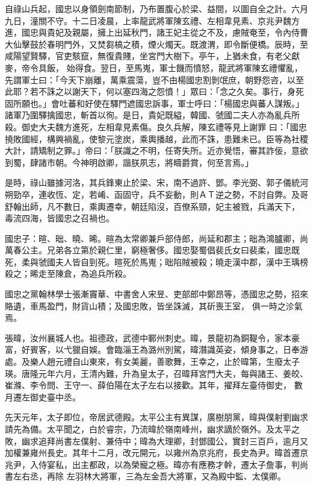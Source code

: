 \begin{pinyinscope}
 自祿山兵起，國忠以身領劍南節制，乃布置腹心於梁、益間，以圖自全之計。六月九日，潼關不守。十二日凌晨，上率龍武將軍陳玄禮、左相韋見素、京兆尹魏方進，國忠與貴妃及親屬，擁上出延秋門，諸王妃主從之不及，慮賊奄至，令內侍曹大仙擊鼓於春明門外，又焚芻槁之積，煙火燭天。既渡渭，即令斷便橋。辰時，至咸陽望賢驛，官吏駭竄，無復貴賤，坐宮門大樹下。亭午，上猶未食，有老父獻麥，帝令具飯，
 始得食。翌日，至馬嵬，軍士饑而憤怒，龍武將軍陳玄禮懼亂，先謂軍士曰：「今天下崩離，萬乘震蕩，豈不由楊國忠割剝氓庶，朝野怨咨，以至此耶？若不誅之以謝天下，何以塞四海之怨憤！」眾曰：「念之久矣。事行，身死固所願也。」會吐蕃和好使在驛門遮國忠訴事，軍士呼曰：「楊國忠與蕃人謀叛。」諸軍乃圍驛擒國忠，斬首以徇。是日，貴妃既縊，韓國、虢國二夫人亦為亂兵所殺。御史大夫魏方進死，左相韋見素傷。良久兵解，陳玄禮等見上謝罪
 曰：「國忠撓敗國經，構興禍亂，使黎元塗炭，乘輿播越，此而不誅，患難未已。臣等為社稷大計，請矯制之罪。」帝曰：「朕識之不明，任寄失所。近亦覺悟，審其詐佞，意欲到蜀，肆諸市朝。今神明啟卿，諧朕夙志，將疇爵賞，何至言焉。」



 是時，祿山雖據河洛，其兵鋒東止於梁、宋，南不過許、鄧。李光弼、郭子儀統河朔勁卒，連收恆、定，若崤、函固守，兵不妄動，則ＡＴ逆之勢，不討自弊。及哥舒翰出師，凡不數日，乘輿遷幸，朝廷陷沒，百僚系頸，妃主被戮，兵滿天下，
 毒流四海，皆國忠之召禍也。



 國忠子：暄、昢、曉、晞。暄為太常卿兼戶部侍郎，尚延和郡主；昢為鴻臚卿，尚萬春公主。兄弟各立第於親仁里，窮極奢侈。國忠娶蜀倡裴氏女曰裴柔，國忠既死，柔與虢國夫人皆自剄死。暄死於馬嵬；昢陷賊被殺；曉走漢中郡，漢中王瑀榜殺之；晞走至陳倉，為追兵所殺。



 國忠之黨翰林學士張漸竇華、中書舍人宋昱、吏部郎中鄭昂等，憑國忠之勢，招來賂遺，車馬盈門，財貨山積；及國忠敗，皆坐誅滅，其斫喪王室，
 俱一時之沴氣焉。



 張暐，汝州襄城人也。祖德政，武德中鄆州刺史。暐，景龍初為銅鞮令，家本豪富，好賓客，以弋獵自娛。會臨淄王為潞州別駕，暐潛識英姿，傾身事之，日奉游處。及樂人趙元禮自山東來，有女美麗，善歌舞，王幸之，止於暐第，生廢太子瑛。唐隆元年六月，王清內難，升為皇太子，召暐拜宮門大夫，每與諸王、姜皎、崔滌、李令問、王守一、薛伯陽在太子左右以接歡。其年，擢拜左臺侍御史，
 數月遷左御史臺中丞。



 先天元年，太子即位，帝居武德殿。太平公主有異謀，廣樹朋黨，暐與僕射劉幽求請先為備。太平聞之，白於睿宗，乃流暐於嶺南峰州，幽求謫於嶺外。及太平之敗，幽求追拜尚書左僕射、兼侍中；暐為大理卿，封鄧國公，實封三百戶，逾月又加權兼雍州長史。其年十二月，改元開元，以雍州為京兆府，長史為尹。暐首遷京兆尹，入侍宴私，出主都政，以為榮寵之極。暐亦有應務才幹，遷太子詹事，判尚書左右丞，再除
 左羽林大將軍，三為左金吾大將軍，又為殿中監、太僕卿。




\end{pinyinscope}
